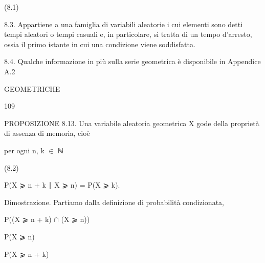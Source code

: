 \documentclass[a4paper,portrait,12pt]{article}
\begin{document}
(8.1)





\begin{flushleft}
8.3. Appartiene a una famiglia di variabili aleatorie i cui elementi sono detti tempi aleatori o tempi casuali e, in particolare, si tratta di un tempo d'arresto, ossia il primo istante in cui una condizione viene soddisfatta.
\end{flushleft}


\begin{flushleft}
8.4. Qualche informazione in più sulla serie geometrica \`{e} disponibile in Appendice A.2
\end{flushleft}





\begin{flushleft}
 GEOMETRICHE
\end{flushleft}





109





\begin{flushleft}
PROPOSIZIONE 8.13. Una variabile aleatoria geometrica X gode della propriet\`{a} di assenza di memoria, cio\`{e}
\end{flushleft}


\begin{flushleft}
per ogni n, k $\in$ ℕ
\end{flushleft}


(8.2)





\begin{flushleft}
P(X ⩾ n + k ∣ X ⩾ n) = P(X ⩾ k).
\end{flushleft}


\begin{flushleft}
Dimostrazione. Partiamo dalla definizione di probabilit\`{a} condizionata,
\end{flushleft}


\begin{flushleft}
P((X ⩾ n + k) $\cap$ (X ⩾ n))
\end{flushleft}


\begin{flushleft}
P(X ⩾ n)
\end{flushleft}


\begin{flushleft}
P(X ⩾ n + k)
\end{flushleft}
\end{document}

